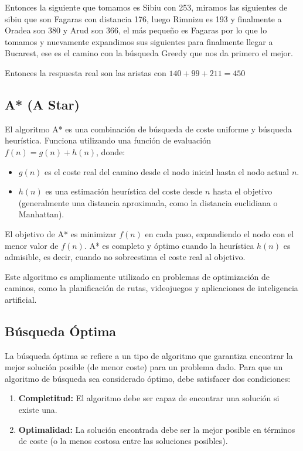 \documentclass[tikz,11pt,fleqn]{book} %
\begin{document}
\begin{example}
    Entonces la siguiente que tomamos es Sibiu con 253, miramos las siguientes de sibiu que son Fagaras con distancia 176, luego Rimnizu es 193 y finalmente a Oradea son 380 y Arud son 366, el más pequeño es Fagaras por lo que lo tomamos y nuevamente expandimos sus siguientes para finalmente llegar a Bucarest, ese es el camino con la búsqueda Greedy que nos da primero el mejor.
\end{example}
Entonces la respuesta real son las aristas con $140+99+211=450$

\subsection{A* (A Star)}

El algoritmo A* es una combinación de búsqueda de coste uniforme y búsqueda heurística. Funciona utilizando una función de evaluación $f(n) = g(n) + h(n)$, donde:

\begin{itemize}
    \item \textbf{$g(n)$} es el coste real del camino desde el nodo inicial hasta el nodo actual $n$.
    \item \textbf{$h(n)$} es una estimación heurística del coste desde $n$ hasta el objetivo (generalmente una distancia aproximada, como la distancia euclidiana o Manhattan).
\end{itemize}

El objetivo de A* es minimizar $f(n)$ en cada paso, expandiendo el nodo con el menor valor de $f(n)$. A* es completo y óptimo cuando la heurística $h(n)$ es admisible, es decir, cuando no sobreestima el coste real al objetivo.

Este algoritmo es ampliamente utilizado en problemas de optimización de caminos, como la planificación de rutas, videojuegos y aplicaciones de inteligencia artificial.

\subsection{Búsqueda Óptima}

La búsqueda óptima se refiere a un tipo de algoritmo que garantiza encontrar la mejor solución posible (de menor coste) para un problema dado. Para que un algoritmo de búsqueda sea considerado óptimo, debe satisfacer dos condiciones:

\begin{enumerate}
    \item \textbf{Completitud:} El algoritmo debe ser capaz de encontrar una solución si existe una.
    \item \textbf{Optimalidad:} La solución encontrada debe ser la mejor posible en términos de coste (o la menos costosa entre las soluciones posibles).
\end{enumerate}
\end{document}
